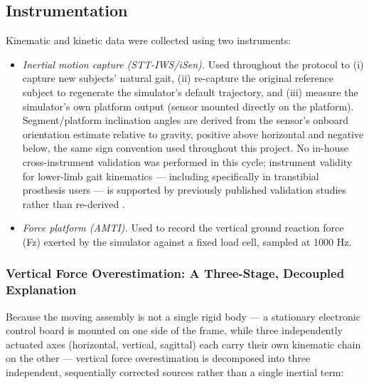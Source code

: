 \documentclass[bioengineering,article,submit,moreauthors]{Definitions/mdpi}
\begin{document}
\subsection{Instrumentation}

Kinematic and kinetic data were collected using two instruments:

\begin{itemize}
\item \textit{Inertial motion capture (STT-IWS/iSen).} Used throughout
the protocol to (i) capture new subjects' natural gait, (ii) re-capture
the original reference subject to regenerate the simulator's default
trajectory, and (iii) measure the simulator's own platform output
(sensor mounted directly on the platform). Segment/platform inclination
angles are derived from the sensor's onboard orientation estimate
relative to gravity, positive above horizontal and negative below, the
same sign convention used throughout this project. No in-house
cross-instrument validation was performed in this cycle; instrument
validity for lower-limb gait kinematics --- including specifically in
transtibial prosthesis users --- is supported by previously published
validation studies rather than re-derived \cite{PENDIENTE_iSen_transtibial}.
\item \textit{Force platform (AMTI).} Used to record the vertical
ground reaction force (Fz) exerted by the simulator against a fixed
load cell, sampled at 1000 Hz.
\end{itemize}

\subsubsection{Vertical Force Overestimation: A Three-Stage, Decoupled Explanation}

Because the moving assembly is not a single rigid body --- a stationary
electronic control board is mounted on one side of the frame, while
three independently actuated axes (horizontal, vertical, sagittal) each
carry their own kinematic chain on the other --- vertical force
overestimation is decomposed into three independent, sequentially
corrected sources rather than a single inertial term:
\end{document}
